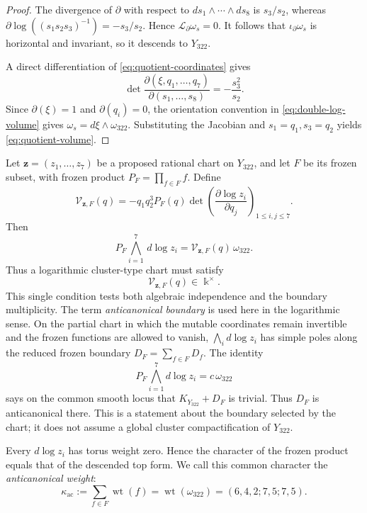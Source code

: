 \documentclass[11pt,reqno]{amsart}
\numberwithin{equation}{section}
\theoremstyle{remark}
\newcommand{\kk}{\Bbbk}
\newcommand{\wt}{\operatorname{wt}}
\newcommand{\dlog}{\,d\!\log}
\begin{document}
\begin{proof}
The divergence of $\partial$ with respect to
$ds_1\wedge\cdots\wedge ds_8$ is $s_3/s_2$, whereas
$\partial\log((s_1s_2s_3)^{-1})=-s_3/s_2$.  Hence
$\mathcal L_{\partial}\omega_s=0$.  It follows that
$\iota_{\partial}\omega_s$ is horizontal and invariant, so it descends to
$Y_{322}$.

A direct differentiation of \eqref{eq:quotient-coordinates} gives
\[ \det\frac{\partial(\xi,q_1,\ldots,q_7)} {\partial(s_1,\ldots,s_8)} =-\frac{s_3^2}{s_2}. \]
Since $\partial(\xi)=1$ and $\partial(q_i)=0$, the orientation convention in
\eqref{eq:double-log-volume} gives
$\omega_s=d\xi\wedge\omega_{322}$.  Substituting the
Jacobian and $s_1=q_1,s_3=q_2$ yields \eqref{eq:quotient-volume}.
\end{proof}

Let $\mathbf z=(z_1,\ldots,z_7)$ be a proposed rational chart on
$Y_{322}$, and let $F$ be its frozen subset, with frozen product
$P_F=\prod_{f\in F}f$.  Define
\begin{equation}
\label{eq:volume-test}
 \mathcal V_{\mathbf z,F}(q)
 =-q_1q_2^3P_F(q)
 \det\left(\frac{\partial\log z_i}{\partial q_j}\right)_{1\le i,j\le7}.
\end{equation}
Then
\[ P_F\bigwedge_{i=1}^7\dlog z_i =\mathcal V_{\mathbf z,F}(q)\,\omega_{322}. \]
Thus a logarithmic cluster-type chart must satisfy
\[ \mathcal V_{\mathbf z,F}(q)\in\kk^\times. \]
This single condition tests both algebraic independence and the boundary
multiplicity.  The term \emph{anticanonical boundary} is used here in the
logarithmic sense.  On the partial chart in which the mutable coordinates
remain invertible and the frozen functions are allowed to vanish,
$\bigwedge_i d\!\log z_i$ has simple poles along the reduced frozen
boundary $D_F=\sum_{f\in F}D_f$.  The identity
\[ P_F\bigwedge_{i=1}^7d\!\log z_i=c\,\omega_{322} \]
says on the common smooth locus that $K_{Y_{322}}+D_F$ is trivial.  Thus
$D_F$ is anticanonical there.  This is a statement about the boundary
selected by the chart; it does not assume a global cluster compactification
of $Y_{322}$.

Every $d\!\log z_i$ has torus weight zero.  Hence the character of the
frozen product equals that of the descended top form.  We call this common
character the \emph{anticanonical weight}:
\begin{equation}
\label{eq:anticanonical-weight}
 \kappa_{\mathrm{ac}}:=\sum_{f\in F}\wt(f)=\wt(\omega_{322})=(6,4,2;7,5;7,5).
\end{equation}
\end{document}
